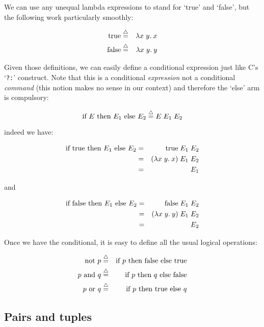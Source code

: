 We can use any unequal lambda expressions to stand for `true' and `false', but
the following work particularly smoothly:

\begin{eqnarray*}
\mbox{true} & \stackrel{\bigtriangleup}{=} & \lambda x\; y.\: x                   \\
\mbox{false} & \stackrel{\bigtriangleup}{=} & \lambda x\; y.\: y
\end{eqnarray*}

Given those definitions, we can easily define a conditional expression just
like C's `{\tt ?:}' construct. Note that this is a conditional {\em expression}
not a conditional {\em command} (this notion makes no sense in our context) and
therefore the `else' arm is compulsory:

$$ \mbox{if } E \mbox{ then } E_1 \mbox{ else } E_2 \stackrel{\bigtriangleup}{=} E\; E_1\; E_2 $$

\noindent indeed we have:

\begin{eqnarray*}
\mbox{if } \mbox{true} \mbox{ then } E_1 \mbox{ else } E_2
  & = & \mbox{true}\; E_1\; E_2                 \\
  & = & (\lambda x\; y.\: x)\; E_1\; E_2            \\
  & = & E_1
\end{eqnarray*}

\noindent and

\begin{eqnarray*}
\mbox{if } \mbox{false} \mbox{ then } E_1 \mbox{ else } E_2
  & = & \mbox{false}\; E_1\; E_2                \\
  & = & (\lambda x\; y.\: y)\; E_1\; E_2            \\
  & = & E_2
\end{eqnarray*}

\noindent Once we have the conditional, it is easy to define all the usual
logical operations:

\begin{eqnarray*}
\mbox{not } p  & \stackrel{\bigtriangleup}{=} & \mbox{if } p \mbox{ then false else true}          \\
p \mbox{ and } q & \stackrel{\bigtriangleup}{=} & \mbox{if } p \mbox{ then } q \mbox{ else false}  \\
p \mbox{ or } q & \stackrel{\bigtriangleup}{=} & \mbox{if } p \mbox{ then true else } q            \\
\end{eqnarray*}

\subsection{Pairs and tuples}


